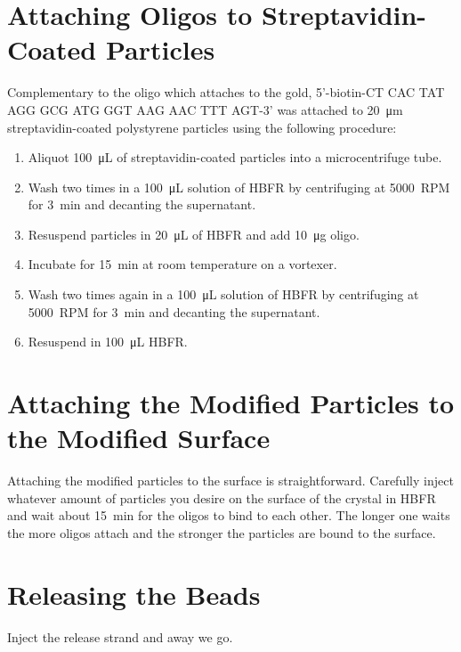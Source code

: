 \documentclass[a4paper]{article}
\begin{document}
\section{Attaching Oligos to Streptavidin-Coated Particles}
Complementary to the oligo which attaches to the gold,
5'-biotin-CT CAC TAT AGG GCG ATG GGT AAG AAC TTT AGT-3' was attached to
\SI{20}{\micro\meter} streptavidin-coated polystyrene particles using the
following procedure:
\begin{enumerate}
 \item Aliquot \SI{100}{\micro\liter} of streptavidin-coated particles into
  a microcentrifuge tube.
 \item Wash two times in a \SI{100}{\micro\liter} solution of HBFR by
  centrifuging at \SI{5000}{RPM} for \SI{3}{\minute} and decanting the
  supernatant.
 \item Resuspend particles in \SI{20}{\micro\liter} of HBFR and add
  \SI{10}{\micro\gram} oligo.
 \item Incubate for \SI{15}{\minute} at room temperature on a vortexer.
 \item Wash two times again in a \SI{100}{\micro\liter} solution of HBFR by
  centrifuging at \SI{5000}{RPM} for \SI{3}{\minute} and decanting the
  supernatant.
 \item Resuspend in \SI{100}{\micro\liter} HBFR\@.
\end{enumerate}

\section{Attaching the Modified Particles to the Modified Surface}
Attaching the modified particles to the surface is straightforward.
Carefully inject whatever amount of particles you desire on the surface of
the crystal in HBFR and wait about \SI{15}{\minute} for the oligos to bind
to each other.  The longer one waits the more oligos attach and the
stronger the particles are bound to the surface.

\section{Releasing the Beads}
Inject the release strand and away we go.
\end{document}
